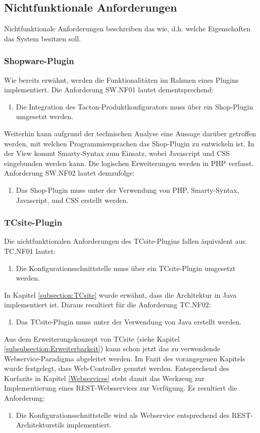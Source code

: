 \documentclass[11pt, a4paper, titlepage, listof=totoc, bibliography=totoc, index=totoc, twoside, openright, headings=normal]{scrreprt}
\begin{document}
\subsection{Nichtfunktionale Anforderungen}
Nichtfunktionale Anforderungen beschreiben das \glqq wie\grqq{}, d.h. welche Eigenschaften das System besitzen soll.

\subsubsection{Shopware-Plugin}
Wie bereits erwähnt, werden die Funktionalitäten im Rahmen eines Plugins implementiert. Die Anforderung SW.NF01 lautet dementsprechend:
\begin{enumerate}[SW.NF01:]\bfseries
\item Die Integration des Tacton-Produktkonfigurators muss über ein Shop-Plugin umgesetzt werden.
\end{enumerate}
Weiterhin kann aufgrund der technischen Analyse eine Aussage darüber getroffen werden, mit welchen Programmiersprachen das Shop-Plugin zu entwickeln ist. In der View kommt Smarty-Syntax zum Einsatz, wobei Javascript und CSS eingebunden werden kann. Die logischen Erweiterungen werden in PHP verfasst. Anforderung SW.NF02 lautet demzufolge:
\begin{enumerate}[SW.NF02:]\bfseries
\item Das Shop-Plugin muss unter der Verwendung von PHP, Smarty-Syntax, Javascript, und CSS erstellt werden.
\end{enumerate}

\subsubsection{TCsite-Plugin}
Die nichtfunktionalen Anforderungen des TCsite-Plugins fallen äquivalent aus. TC.NF01 lautet:
\begin{enumerate}[TC.NF01:]\bfseries
\item Die Konfigurationsschnittstelle muss über ein TCsite-Plugin umgesetzt werden.
\end{enumerate}
In Kapitel \ref{subsection:TCsite} wurde erwähnt, dass die Architektur in Java implementiert ist. Daraus resultiert für die Anforderung TC.NF02:
\begin{enumerate}[TC.NF02:]\bfseries
\item Das TCsite-Plugin muss unter der Verwendung von Java erstellt werden.
\end{enumerate}
Aus dem Erweiterungskonzept von TCsite (siehe Kapitel \ref{subsubsection:Erweiterbarkeit})
 kann schon jetzt das zu verwendende Webservice-Paradigma abgeleitet werden. Im Fazit des vorangegenen Kapitels wurde festgelegt, dass Web-Controller genutzt werden. Entsprechend des Kurfazits in Kapitel \ref{Webservices} steht damit das Werkzeug zur Implementierung eines REST-Websservices zur Verfügung. Es resultiert die Anforderung:
\begin{enumerate}[TC.NF03:]\bfseries
\item Die Konfigurationsschnittstelle wird als Webservice entsprechend des REST-Architekturstils implementiert.
\end{enumerate}
\end{document}
